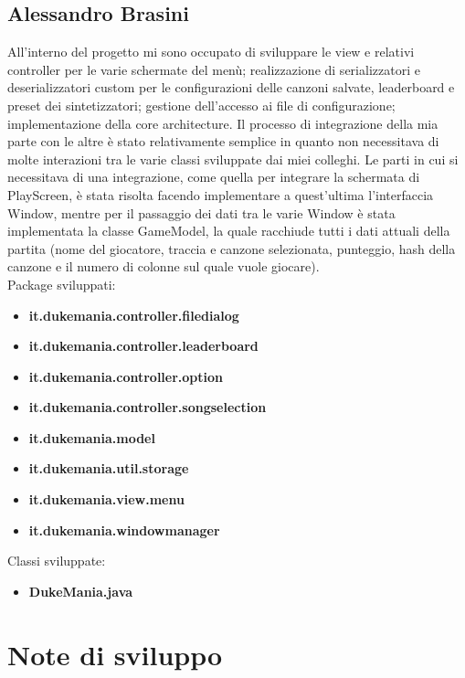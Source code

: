 \documentclass[a4paper,12pt]{report}
\begin{document}
\subsection{Alessandro Brasini}
All'interno del progetto mi sono occupato di sviluppare le view e relativi controller per le varie schermate del menù; realizzazione di serializzatori e 
deserializzatori custom per le configurazioni delle canzoni salvate, leaderboard e preset dei sintetizzatori; gestione dell'accesso ai file di configurazione;
implementazione della core architecture.
Il processo di integrazione della mia parte con le altre è stato relativamente semplice in quanto non necessitava di molte interazioni
tra le varie classi sviluppate dai miei colleghi. Le parti in cui si necessitava di una integrazione, come quella per integrare la schermata di PlayScreen,
è stata risolta facendo implementare a quest'ultima l'interfaccia Window, mentre per il passaggio dei dati tra le varie Window è stata implementata la 
classe GameModel, la quale racchiude tutti i dati attuali della partita (nome del giocatore, traccia e canzone selezionata, punteggio, hash della canzone e il numero di 
colonne sul quale vuole giocare). \\
Package sviluppati:
\begin{itemize}
	\item \textbf{it.dukemania.controller.filedialog}
	\item \textbf{it.dukemania.controller.leaderboard}
	\item \textbf{it.dukemania.controller.option}
	\item \textbf{it.dukemania.controller.songselection}
	\item \textbf{it.dukemania.model}
	\item \textbf{it.dukemania.util.storage}
	\item \textbf{it.dukemania.view.menu}
	\item \textbf{it.dukemania.windowmanager}
\end{itemize}
Classi sviluppate:
\begin{itemize}
	\item \textbf{DukeMania.java}
\end{itemize}
\newpage



\section{Note di sviluppo}
\end{document}
